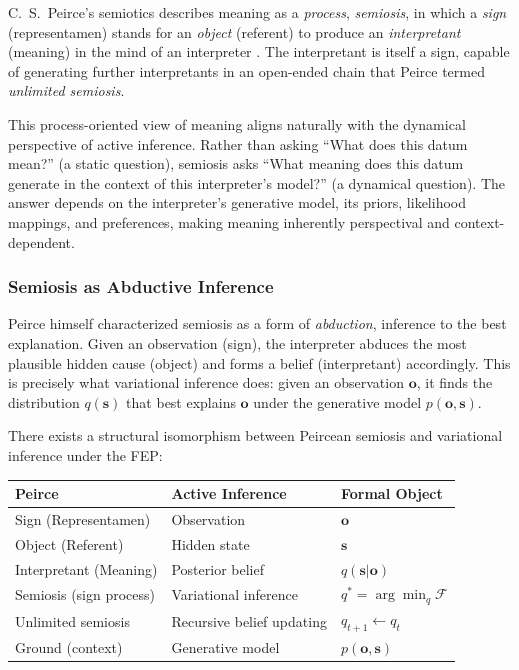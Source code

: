 \documentclass[11pt,a4paper]{article}
\theoremstyle{definition}
\newcommand{\bq}{q}
\newcommand{\bp}{p}
\newcommand{\bo}{\bm{o}}
\newcommand{\bs}{\bm{s}}
\begin{document}
C.~S.~Peirce's semiotics describes meaning as a \emph{process}, \emph{semiosis}, in which a \emph{sign} (representamen) stands for an \emph{object} (referent) to produce an \emph{interpretant} (meaning) in the mind of an interpreter \citep{peirce1931collected}. The interpretant is itself a sign, capable of generating further interpretants in an open-ended chain that Peirce termed \emph{unlimited semiosis}.

This process-oriented view of meaning aligns naturally with the dynamical perspective of active inference. Rather than asking ``What does this datum mean?'' (a static question), semiosis asks ``What meaning does this datum generate in the context of this interpreter's model?'' (a dynamical question). The answer depends on the interpreter's generative model, its priors, likelihood mappings, and preferences, making meaning inherently perspectival and context-dependent.

\subsubsection{Semiosis as Abductive Inference}

Peirce himself characterized semiosis as a form of \emph{abduction}, inference to the best explanation. Given an observation (sign), the interpreter abduces the most plausible hidden cause (object) and forms a belief (interpretant) accordingly. This is precisely what variational inference does: given an observation $\bo$, it finds the distribution $\bq(\bs)$ that best explains $\bo$ under the generative model $\bp(\bo, \bs)$.


There exists a structural isomorphism between Peircean semiosis and variational inference under the FEP:

\vspace{4pt}
\begin{center}
\begin{tabular}{lll}
\toprule
\textbf{Peirce} & \textbf{Active Inference} & \textbf{Formal Object} \\
\midrule
Sign (Representamen) & Observation & $\bo$ \\
Object (Referent) & Hidden state & $\bs$ \\
Interpretant (Meaning) & Posterior belief & $\bq(\bs|\bo)$ \\
Semiosis (sign process) & Variational inference & $\bq^* = \arg\min_{\bq} \mathcal{F}$ \\
Unlimited semiosis & Recursive belief updating & $\bq_{t+1} \leftarrow \bq_t$ \\
Ground (context) & Generative model & $\bp(\bo, \bs)$ \\
\bottomrule
\end{tabular}
\end{center}
\end{document}
